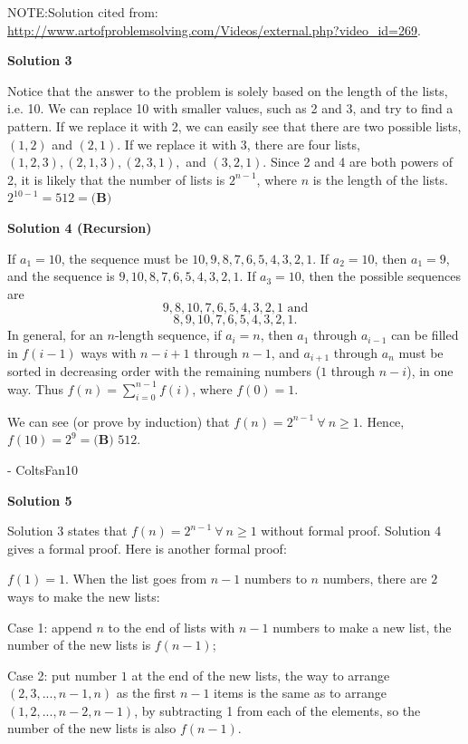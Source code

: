 \begin{enumerate}
 NOTE:Solution cited from: \href{https://artofproblemsolving.comhttp://www.artofproblemsolving.com/Videos/external.php?video\_id=269}{http://www.artofproblemsolving.com/Videos/external.php?video\_id=269}.

 



\textbf{Solution 3}

Notice that the answer to the problem is solely based on the length of the lists, i.e. 10. We can replace 10 with smaller values, such as 2 and 3, and try to find a pattern. If we replace it with 2, we can easily see that there are two possible lists, $(1, 2)$ and $(2, 1)$. If we replace it with 3, there are four lists, $(1, 2, 3), (2, 1, 3), (2, 3, 1),$ and $(3, 2, 1)$. Since 2 and 4 are both powers of 2, it is likely that the number of lists is $2^{n-1}$, where $n$ is the length of the lists. $2^{10-1}=512=\boxed{\textbf{(B)}}$




\textbf{Solution 4 (Recursion)}

If $a_1=10$, the sequence must be $10, 9, 8,7,6,5,4,3,2,1$. If $a_2=10$, then $a_1=9$, and the sequence is $9, 10, 8, 7, 6, 5,4,3,2,1$. If $a_3=10$, then the possible sequences are 
 \[9,8,10,7,6,5,4,3,2,1 \text{ and}\]
 \[8,9,10,7,6,5,4,3,2,1.\] In general, for an $n$-length sequence, if $a_i=n$, then $a_1$ through $a_{i-1}$ can be filled in $f(i-1)$ ways with $n-i+1$ through $n-1$, and $a_{i+1}$ through $a_{n}$ must be sorted in decreasing order with the remaining numbers ($1$ through $n-i$), in one way. Thus $f(n) = \sum_{i=0}^{n-1} f(i)$, where $f(0)=1$.

 We can see (or prove by induction) that $f(n)=2^{n-1} ~\forall~ n \ge 1$. Hence, $f(10)=2^9=\boxed{\textbf{(B) }512}$.

 - ColtsFan10

 



\textbf{Solution 5}

Solution 3 states that $f(n)=2^{n-1} ~\forall~ n \ge 1$ without formal proof.  Solution 4 gives a formal proof.  Here is another formal proof:

 $f(1)=1$.  When the list goes from $n-1$ numbers to $n$ numbers, there are $2$ ways to make the new lists:

 Case 1: append $n$ to the end of lists with $n-1$ numbers to make a new list, the number of the new lists is $f(n-1)$;

 Case 2: put number $1$ at the end of the new lists, the way to arrange $(2,3,...,n-1,n)$ as the first $n-1$ items is the same as to arrange $(1,2,...,n-2,n-1)$, by subtracting 1 from each of the elements, so the number of the new lists is also $f(n-1)$.


\end{enumerate}
